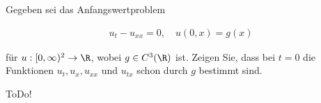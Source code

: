 
\begin{exercise}

Gegeben sei das Anfangswertproblem

\begin{align*}
    u_t - u_{xx} = 0,
    \quad
    u(0, x) = g(x)
\end{align*}

für $u: [0, \infty)^2 \to \R$, wobei $g \in C^3(\R)$ ist.
Zeigen Sie, dass bei $t = 0$ die Funktionen $u_t, u_x, u_{xx}$ und $u_{tx}$ schon durch $g$ bestimmt sind.

\end{exercise}


\begin{solution}

ToDo!

\end{solution}


